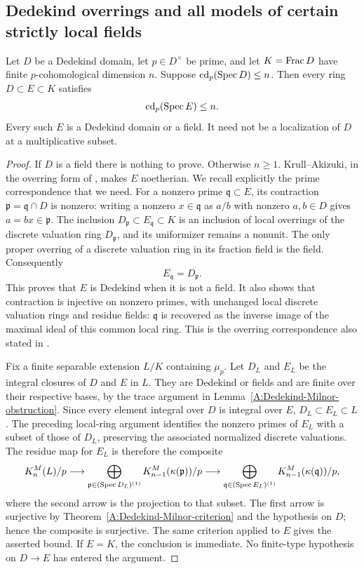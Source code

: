 \subsection{Dedekind overrings and all models of certain strictly local fields}

\begin{lemma}
\label{A:Dedekind-overring-cd}
Let $D$ be a Dedekind domain, let $p\in D^\times$ be prime,
and let $K=\operatorname{Frac} D$ have finite $p$-cohomological dimension $n$.
Suppose $\operatorname{cd}_p(\operatorname{Spec} D)\leq n$. Then every ring
$D\subset E\subset K$ satisfies
\[
 \operatorname{cd}_p(\operatorname{Spec} E)\leq n.
\]
Every such $E$ is a Dedekind domain or a field. It need not be a
localization of $D$ at a multiplicative subset.
\end{lemma}
\begin{proof}
If $D$ is a field there is nothing to prove. Otherwise $n\geq1$.
Krull--Akizuki, in the overring form of
\citet[Tag 00PG, Lemma 10.119.12]{A_Stacks}, makes $E$ noetherian.
We recall explicitly the prime correspondence that we need.
For a nonzero prime $\mathfrak q\subset E$, its contraction
$\mathfrak p=\mathfrak q\cap D$ is nonzero: writing a nonzero
$x\in\mathfrak q$ as $a/b$ with nonzero $a,b\in D$ gives
$a=bx\in\mathfrak p$. The inclusion
$D_{\mathfrak p}\subset E_{\mathfrak q}\subset K$ is an inclusion
of local overrings of the discrete valuation ring $D_{\mathfrak p}$,
and its uniformizer remains a nonunit. The only proper overring
of a discrete valuation ring in its fraction field is the field.
Consequently
\[
 E_{\mathfrak q}=D_{\mathfrak p}.
\]
This proves that $E$ is Dedekind when it is not a field. It also
shows that contraction is injective on nonzero primes, with
unchanged local discrete valuation rings and residue fields:
$\mathfrak q$ is recovered as the inverse image of the maximal
ideal of this common local ring. This is the overring correspondence
also stated in \citet[Lemma 1, p.~216]{A_Clark2009}.

Fix a finite separable extension $L/K$ containing $\mu_p$.
Let $D_L$ and $E_L$ be the integral closures of $D$ and $E$ in $L$.
They are Dedekind or fields and are finite over their respective
bases, by the trace argument in
Lemma~\ref{A:Dedekind-Milnor-obstruction}.
Since every element integral over $D$ is integral over $E$,
$D_L\subset E_L\subset L$. The preceding local-ring argument
identifies the nonzero primes of $E_L$ with a subset of those of
$D_L$, preserving the associated normalized discrete valuations.
The residue map for $E_L$ is therefore the composite
\[
 K_n^M(L)/p\longrightarrow
 \bigoplus_{\mathfrak p\in(\operatorname{Spec} D_L)^{(1)}}
 K_{n-1}^M(\kappa(\mathfrak p))/p
 \longrightarrow
 \bigoplus_{\mathfrak q\in(\operatorname{Spec} E_L)^{(1)}}
 K_{n-1}^M(\kappa(\mathfrak q))/p,
\]
where the second arrow is the projection to that subset.
The first arrow is surjective by
Theorem~\ref{A:Dedekind-Milnor-criterion} and the hypothesis on $D$;
hence the composite is surjective. The same criterion applied to
$E$ gives the asserted bound. If $E=K$, the conclusion is immediate.
No finite-type hypothesis on $D\to E$ has entered the argument.
\end{proof}

